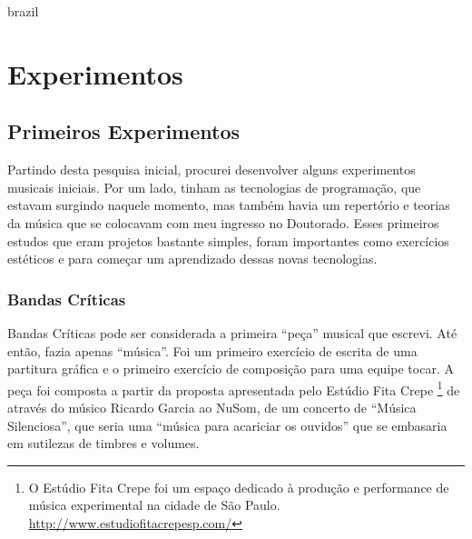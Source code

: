 %


\begin{otherlanguage*}{brazil}

    \chapter[Experimentos]{Experimentos}


    \begin{flushright}
         
    \end{flushright}


\section{Primeiros Experimentos}

Partindo desta pesquisa inicial, procurei desenvolver alguns experimentos musicais iniciais.  Por um lado, tinham as tecnologias de programação, que estavam surgindo naquele momento, mas também havia um repertório e teorias da música que se colocavam com meu ingresso no Doutorado. Esses primeiros estudos que eram projetos bastante simples, foram importantes como exercícios estéticos e para começar um aprendizado dessas novas tecnologias.


\subsection{Bandas Críticas}
Bandas Críticas pode ser considerada a primeira ``peça'' musical que escrevi. Até então, fazia apenas ``música''. Foi um primeiro exercício de escrita de uma partitura gráfica e o primeiro exercício de composição para uma equipe tocar. A peça foi composta a partir da proposta apresentada pelo Estúdio Fita Crepe \footnote{O Estúdio Fita Crepe foi um espaço dedicado à produção e performance de música experimental na cidade de São Paulo. \url{http://www.estudiofitacrepesp.com/}} de através do músico Ricardo Garcia ao NuSom, de um concerto de ``Música Silenciosa'', que seria uma ``música para acariciar os ouvidos'' que se embasaria em sutilezas de timbres e volumes.


\end{otherlanguage*}
